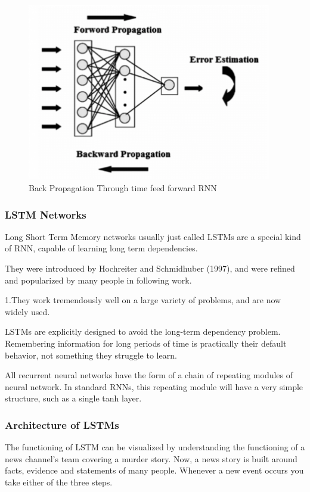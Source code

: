 \documentclass[12pt]{report}
\begin{document}
\begin{figure}[H]%
  \begin {center}
  \includegraphics[width=0.95\textwidth]{images/bptt.png}
  \caption{Back Propagation Through time feed forward RNN}
  \label{fig:ecg}
  \end {center}
\end{figure}


\subsubsection{LSTM Networks}

Long Short Term Memory networks  usually just called LSTMs  are a special kind of RNN, capable of learning long term dependencies.

They were introduced by Hochreiter and Schmidhuber (1997), and were refined and popularized by many people in following work.

1.They work tremendously well on a large variety of problems, and are now widely used.

LSTMs are explicitly designed to avoid the long-term dependency problem. Remembering information for long periods of time is practically their default behavior, not something they struggle to learn.

All recurrent neural networks have the form of a chain of repeating modules of neural network. In standard RNNs, this repeating module will have a very simple structure, such as a single tanh layer.

\subsubsection{Architecture of LSTMs}
The functioning of LSTM can be visualized by understanding the functioning of a news channel’s team covering a murder story. Now, a news story is built around facts, evidence and statements of many people. Whenever a new event occurs you take either of the three steps.
\end{document}
